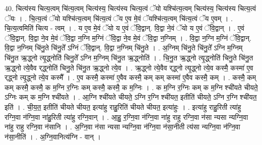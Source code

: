 \documentclass[17pt]{extarticle}
\begin{document}
40. चित्य॑स्य चित्य॒त्वम् चि॑त्य॒त्वम् चित्य॑स्य॒ चित्य॑स्य चित्य॒त्वं ॅयो यश्चि॑त्य॒त्वम् चित्य॑स्य॒ चित्य॑स्य चित्य॒त्वं ॅयः । . चि॒त्य॒त्वं ॅयो यश्चि॑त्य॒त्वम् चि॑त्य॒त्वं ॅय ए॒व मे॒वं ॅयश्चि॑त्य॒त्वम् चि॑त्य॒त्वं ॅय ए॒वम् । . चि॒त्य॒त्वमिति॑ चित्य - त्वम् । . य ए॒व मे॒वं ॅयो य ए॒वं ॅवि॒द्वान्. वि॒द्वा ने॒वं ॅयो य ए॒वं ॅवि॒द्वान् । . ए॒वं ॅवि॒द्वान्. वि॒द्वा ने॒व मे॒वं ॅवि॒द्वा न॒ग्नि म॒ग्निं ॅवि॒द्वा ने॒व मे॒वं ॅवि॒द्वा न॒ग्निम् । . वि॒द्वा न॒ग्नि म॒ग्निं ॅवि॒द्वान्. वि॒द्वा न॒ग्निम् चि॑नु॒ते चि॑नु॒ते᳚ ऽग्निं ॅवि॒द्वान्. वि॒द्वा न॒ग्निम् चि॑नु॒ते । . अ॒ग्निम् चि॑नु॒ते चि॑नु॒ते᳚ ऽग्नि म॒ग्निम् चि॑नु॒त ऋ॒द्ध्नो त्यृ॒द्ध्नोति॑ चिनु॒ते᳚ ऽग्नि म॒ग्निम् चि॑नु॒त ऋ॒द्ध्नोति॑ । . चि॒नु॒त ऋ॒द्ध्नो त्यृ॒द्ध्नोति॑ चिनु॒ते चि॑नु॒त ऋ॒द्ध्नो त्ये॒वैव र्‌द्ध्नोति॑ चिनु॒ते चि॑नु॒त ऋ॒द्ध्नो त्ये॒व । . ऋ॒द्ध्नो त्ये॒वैव र्‌द्ध्नो त्यृ॒द्ध्नो त्ये॒व कस्मै॒ कस्मा॑ ए॒व र्‌द्ध्नो त्यृ॒द्ध्नो त्ये॒व कस्मै᳚ । . ए॒व कस्मै॒ कस्मा॑ ए॒वैव कस्मै॒ कम् कम् कस्मा॑ ए॒वैव कस्मै॒ कम् । . कस्मै॒ कम् कम् कस्मै॒ कस्मै॒ क म॒ग्नि र॒ग्निः कम् कस्मै॒ कस्मै॒ क म॒ग्निः । . क म॒ग्नि र॒ग्निः कम् क म॒ग्नि श्ची॑यते चीयते॒ ऽग्निः कम् क म॒ग्नि श्ची॑यते । . आ॒ग्नि श्ची॑यते चीयते॒ ऽग्नि र॒ग्नि श्ची॑यत॒ इतीति॑ चीयते॒ ऽग्नि र॒ग्नि श्ची॑यत॒ इति॑ । . ची॒य॒त॒ इतीति॑ चीयते चीयत॒ इत्या॑हु राहु॒रिति॑ चीयते चीयत॒ इत्या॑हुः । . इत्या॑हु राहु॒रिती त्या॑हु रग्नि॒वा न॑ग्नि॒वा ना॑हु॒रिती त्या॑हु रग्नि॒वान् । . आ॒हु॒ र॒ग्नि॒वा न॑ग्नि॒वा ना॑हु राहु रग्नि॒वा न॑सा न्यसा न्यग्नि॒वा ना॑हु राहु रग्नि॒वा न॑सानि । . अ॒ग्नि॒वा न॑सा न्यसा न्यग्नि॒वा न॑ग्नि॒वा न॑सा॒नीती त्य॑सा न्यग्नि॒वा न॑ग्नि॒वा न॑सा॒नीति॑ । . अ॒ग्नि॒वानित्य॑ग्नि - वान् । \newline
\pagebreak
{}
\end{document}
